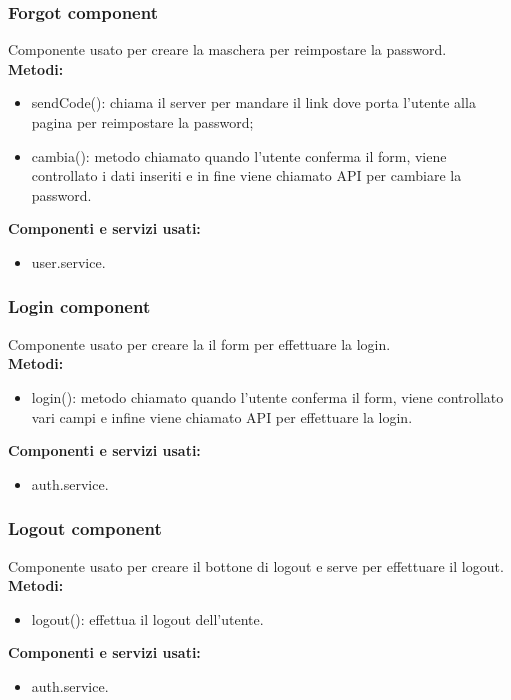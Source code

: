 \subsubsection{Forgot component}
Componente usato per creare la maschera per reimpostare la password.\\
\textbf{Metodi:}
\begin{itemize}
    \item sendCode(): chiama il server per mandare il link dove porta l'utente alla pagina per reimpostare la password;
    \item cambia(): metodo chiamato quando l'utente conferma il form, viene controllato i dati inseriti e in fine viene chiamato API per cambiare la password.
\end{itemize}
\textbf{Componenti e servizi usati:}
\begin{itemize}
    \item user.service.
\end{itemize}

\subsubsection{Login component}
Componente usato per creare la il form per effettuare la login.\\
\textbf{Metodi:}
\begin{itemize}
    \item login(): metodo chiamato quando l'utente conferma il form, viene controllato vari campi e infine viene chiamato API per effettuare la login.
\end{itemize}
\textbf{Componenti e servizi usati:}
\begin{itemize}
    \item auth.service.
\end{itemize}

\subsubsection{Logout component}
Componente usato per creare il bottone di logout e serve per effettuare il logout.\\
\textbf{Metodi:}
\begin{itemize}
    \item logout(): effettua il logout dell'utente.
\end{itemize}
\textbf{Componenti e servizi usati:}
\begin{itemize}
    \item auth.service.
\end{itemize}

